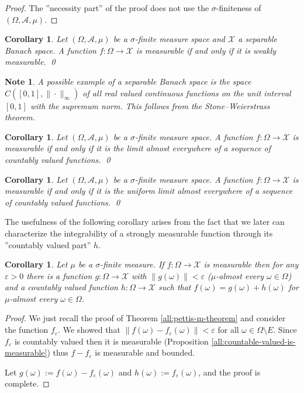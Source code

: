 \documentclass[a4paper, 12pt]{article}
\newtheorem{note}[lem]{Note}
\newtheorem{corollary}[lem]{Corollary}
\begin{document}
\begin{proof} The ''necessity part'' of the proof does not use the $\sigma$-finiteness of $(\Omega, \mathcal{A}, \mu)$.
\end{proof}
\begin{corollary}\label{all:pettis-corollary} Let $(\Omega, \mathcal{A}, \mu)$ be a $\sigma$-finite measure space and $\mathcal{X}$ a separable Banach space.  A function $f \colon \Omega \rightarrow \mathcal{X}$ is measurable if and only if it is weakly measurable. \qed
\end{corollary}
\begin{note}\normalfont A possible example of a separable Banach space is the space $C([0,1], \| \cdot \|_{\infty})$ of all real valued continuous functions on the unit interval $[0,1]$ with the supremum norm. This follows from the Stone\---Weierstrass theorem.
\end{note}
\begin{corollary} Let $(\Omega, \mathcal{A}, \mu)$ be a $\sigma$-finite measure space. A function $f \colon \Omega \rightarrow \mathcal{X}$ is measurable if and only if it is the limit almost everywhere of a sequence of countably valued functions. \qed
\end{corollary}
\begin{corollary}\label{all:merheto-fuggveny-egy-hatarerteke-megsz-erteku-fuggvenyeknek} Let $(\Omega, \mathcal{A}, \mu)$ be a $\sigma$-finite measure space. A function $f \colon \Omega \rightarrow \mathcal{X}$ is measurable if and only if it is the uniform limit almost everywhere of a sequence of countably valued functions. \qed
\end{corollary}
The usefulness of the following corollary arises from the fact that we later can characterize the integrability of a strongly measurable function through its ''countably valued part'' $h$.
\begin{corollary}\label{all:measurabledecomposition} Let $\mu$ be a $\sigma$-finite measure. If $f \colon \Omega \to \mathcal{X}$ is measurable then for any $\varepsilon > 0$ there is a function $g \colon \Omega \to \mathcal{X}$ with $\| g(\omega)\| < \varepsilon$ ($\mu$-almost every $\omega \in \Omega$) and a countably valued function $h \colon \Omega \to \mathcal{X}$ such that
$f(\omega) = g(\omega) + h(\omega)$ for $\mu$-almost every $\omega \in \Omega$.
\end{corollary}
\begin{proof}
We just recall the proof of Theorem \ref{all:pettis-m-theorem} and consider the function $f_{\varepsilon}$. We showed that $\| f(\omega)-f_{\varepsilon}(\omega) \| < \varepsilon$ for all $\omega \in \Omega \setminus E$. Since $f_{\varepsilon}$ is countably valued then it is measurable (Proposition \ref{all:countable-valued-is-measurable}) thus $f-f_{\varepsilon}$ is measurable and bounded.

Let $g(\omega) := f(\omega) - f_\varepsilon(\omega)$ and $h(\omega) := f_{\varepsilon}(\omega)$, and the proof is complete.
\end{proof}
\end{document}
